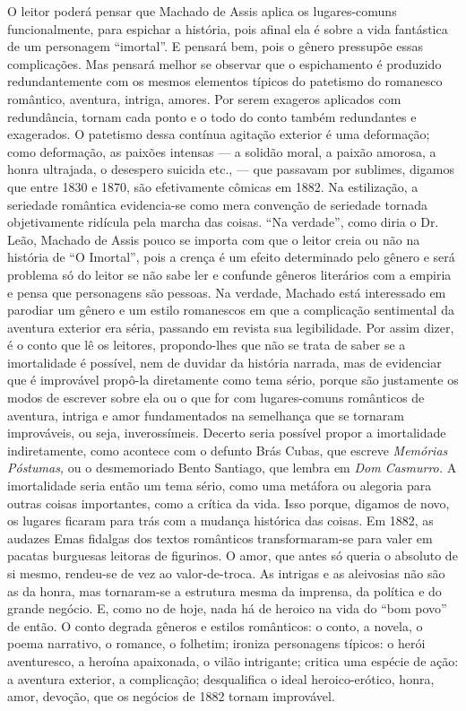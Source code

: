 O leitor poderá pensar que Machado de Assis aplica os lugares-comuns
funcionalmente, para espichar a história, pois afinal ela é sobre a vida
fantástica de um personagem ``imortal''. E pensará bem, pois o gênero
pressupõe essas complicações. Mas pensará melhor se observar que o
espichamento é produzido redundantemente com os mesmos elementos típicos
do patetismo do romanesco romântico, aventura, intriga, amores. Por
serem exageros aplicados com redundância, tornam cada ponto e o todo do
conto também redundantes e exagerados. O patetismo dessa contínua
agitação exterior é uma deformação; como deformação, as paixões intensas
--- a solidão moral, a paixão amorosa, a honra ultrajada, o desespero
suicida etc., --- que passavam por sublimes, digamos que entre 1830 e
1870, são efetivamente cômicas em 1882. Na estilização, a seriedade
romântica evidencia-se como mera convenção de seriedade tornada
objetivamente ridícula pela marcha das coisas. ``Na verdade'', como diria
o Dr.\,Leão, Machado de Assis pouco se importa com que o leitor creia ou
não na história de ``O Imortal'', pois a crença é um efeito determinado
pelo gênero e será problema só do leitor se não sabe ler e confunde
gêneros literários com a empiria e pensa que personagens são pessoas. Na
verdade, Machado está interessado em parodiar um gênero e um estilo
romanescos em que a complicação sentimental da aventura exterior era
séria, passando em revista sua legibilidade. Por assim dizer, é o conto
que lê os leitores, propondo-lhes que não se trata de saber se a
imortalidade é possível, nem de duvidar da história narrada, mas de
evidenciar que é improvável propô-la diretamente como tema sério, porque
são justamente os modos de escrever sobre ela ou o que for com
lugares-comuns românticos de aventura, intriga e amor fundamentados na
semelhança que se tornaram improváveis, ou seja, inverossímeis. Decerto
seria possível propor a imortalidade indiretamente, como acontece com o
defunto Brás Cubas, que escreve \emph{Memórias Póstumas,} ou o
desmemoriado Bento Santiago, que lembra em \emph{Dom Casmurro.} A
imortalidade seria então um tema sério, como uma metáfora ou alegoria
para outras coisas importantes, como a crítica da vida. Isso porque,
digamos de novo, os lugares ficaram para trás com a mudança histórica
das coisas. Em 1882, as audazes Emas fidalgas dos textos românticos
transformaram-se para valer em pacatas burguesas leitoras de figurinos.
O amor, que antes só queria o absoluto de si mesmo, rendeu-se de vez ao
valor-de-troca. As intrigas e as aleivosias não são as da honra, mas
tornaram-se a estrutura mesma da imprensa, da política e do grande
negócio. E, como no de hoje, nada há de heroico na vida do ``bom povo'' de
então. O conto degrada gêneros e estilos românticos: o conto, a novela,
o poema narrativo, o romance, o folhetim; ironiza personagens típicos: o
herói aventuresco, a heroína apaixonada, o vilão intrigante; critica uma
espécie de ação: a aventura exterior, a complicação; desqualifica o
ideal heroico-erótico, honra, amor, devoção, que os negócios de 1882
tornam improvável.

